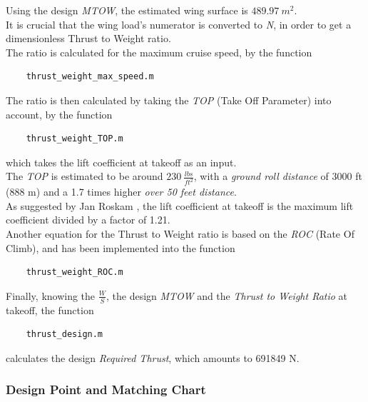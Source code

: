 \documentclass{article}
\begin{document}
Using the design \textit{MTOW}, the estimated wing surface is $489.97 \ m^2$. \\ 

It is crucial that the wing load's numerator is converted to \textit{N}, in order to get a dimensionless
Thrust to Weight ratio.\\ 
The ratio is calculated for the maximum cruise speed, by the function 
\begin{verbatim}
    thrust_weight_max_speed.m
\end{verbatim}



\clearpage

The ratio is then calculated by taking the \textit{TOP} (Take Off Parameter) into account, by the function 
\begin{verbatim}
    thrust_weight_TOP.m
\end{verbatim}
which takes the lift coefficient at takeoff as an input.\\ 

The \textit{TOP} is estimated to be around $230 \ \frac{lbs}{ft^2}$, with a \textit{ground roll distance}
of 3000 ft (888 m) and a 1.7 times higher \textit{over 50 feet distance}.\\ 
As suggested by Jan Roskam \autocite{Roskam}, the lift coefficient at takeoff is the maximum lift coefficient
divided by a factor of 1.21. \\ 

Another equation for the Thrust to Weight ratio is based on the \textit{ROC} (Rate Of Climb), 
and has been implemented into the function

\begin{verbatim}
    thrust_weight_ROC.m
\end{verbatim}

Finally, knowing the $\frac{W}{S}$, the design \textit{MTOW} and the \textit{Thrust to Weight Ratio} at takeoff, 
the function 
\begin{verbatim}
    thrust_design.m
\end{verbatim}

calculates the design \textit{Required Thrust}, which amounts to 691849 N.

\clearpage

\subsubsection{Design Point and Matching Chart\label{Matching_chart}}
\end{document}
